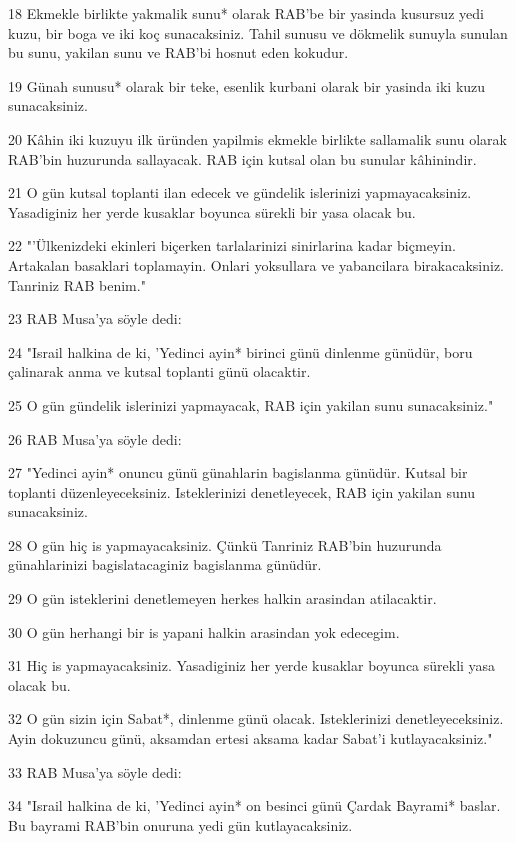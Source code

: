 \par 18 Ekmekle birlikte yakmalik sunu* olarak RAB'be bir yasinda kusursuz yedi kuzu, bir boga ve iki koç sunacaksiniz. Tahil sunusu ve dökmelik sunuyla sunulan bu sunu, yakilan sunu ve RAB'bi hosnut eden kokudur.
\par 19 Günah sunusu* olarak bir teke, esenlik kurbani olarak bir yasinda iki kuzu sunacaksiniz.
\par 20 Kâhin iki kuzuyu ilk üründen yapilmis ekmekle birlikte sallamalik sunu olarak RAB'bin huzurunda sallayacak. RAB için kutsal olan bu sunular kâhinindir.
\par 21 O gün kutsal toplanti ilan edecek ve gündelik islerinizi yapmayacaksiniz. Yasadiginiz her yerde kusaklar boyunca sürekli bir yasa olacak bu.
\par 22 "'Ülkenizdeki ekinleri biçerken tarlalarinizi sinirlarina kadar biçmeyin. Artakalan basaklari toplamayin. Onlari yoksullara ve yabancilara birakacaksiniz. Tanriniz RAB benim."
\par 23 RAB Musa'ya söyle dedi:
\par 24 "Israil halkina de ki, 'Yedinci ayin* birinci günü dinlenme günüdür, boru çalinarak anma ve kutsal toplanti günü olacaktir.
\par 25 O gün gündelik islerinizi yapmayacak, RAB için yakilan sunu sunacaksiniz."
\par 26 RAB Musa'ya söyle dedi:
\par 27 "Yedinci ayin* onuncu günü günahlarin bagislanma günüdür. Kutsal bir toplanti düzenleyeceksiniz. Isteklerinizi denetleyecek, RAB için yakilan sunu sunacaksiniz.
\par 28 O gün hiç is yapmayacaksiniz. Çünkü Tanriniz RAB'bin huzurunda günahlarinizi bagislatacaginiz bagislanma günüdür.
\par 29 O gün isteklerini denetlemeyen herkes halkin arasindan atilacaktir.
\par 30 O gün herhangi bir is yapani halkin arasindan yok edecegim.
\par 31 Hiç is yapmayacaksiniz. Yasadiginiz her yerde kusaklar boyunca sürekli yasa olacak bu.
\par 32 O gün sizin için Sabat*, dinlenme günü olacak. Isteklerinizi denetleyeceksiniz. Ayin dokuzuncu günü, aksamdan ertesi aksama kadar Sabat'i kutlayacaksiniz."
\par 33 RAB Musa'ya söyle dedi:
\par 34 "Israil halkina de ki, 'Yedinci ayin* on besinci günü Çardak Bayrami* baslar. Bu bayrami RAB'bin onuruna yedi gün kutlayacaksiniz.
